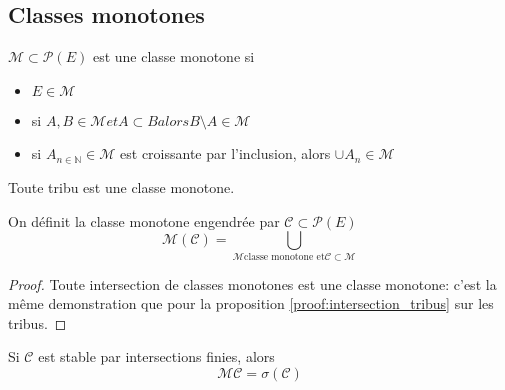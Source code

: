 \subsection{Classes monotones}

\begin{definition}
	$\mathscr{M} \subset \mathscr{P}(E)$ est une classe monotone si
	\begin{itemize}
		\item $E\in \mathscr{M}$
		\item si $A,B \in \mathscr{M} et A \subset B alors B\setminus A \in \mathscr{M}$
		\item si $A_{n\in\mathbb{N}} \in \mathscr{M}$ est croissante par l'inclusion, alors $\cup A_n \in \mathscr{M}$
	\end{itemize}
\end{definition}

\begin{remarque}
	Toute tribu est une classe monotone.
\end{remarque}

\begin{definition}
	On définit la classe monotone engendrée par $\mathscr{C} \subset \mathscr{P}(E)$
	$$ \mathscr{M}(\mathscr{C}) = \bigcup\limits_{\mathscr{M} \text{classe monotone et} \mathscr{C} \subset \mathscr{M}} \mathscr{} $$
\end{definition}

\begin{proof}
	Toute intersection de classes monotones est une classe monotone: c'est la même demonstration que pour la proposition \ref{proof:intersection_tribus} sur les tribus.
\end{proof}

\begin{theorem}
	Si $\mathscr{C}$ est stable par intersections finies, alors
	$$ \mathscr{M}\mathscr{C} = \sigma(\mathscr{C}) $$
\end{theorem}


